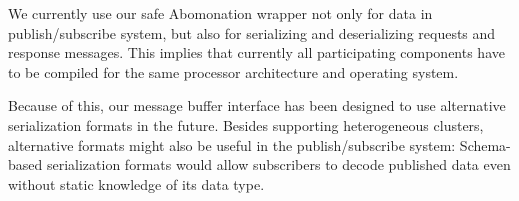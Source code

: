 We currently use our safe Abomonation wrapper not only for data in
publish/subscribe system, but also for serializing and deserializing requests
and response messages. This implies that currently all participating components
have to be compiled for the same processor architecture and operating system.

Because of this, our message buffer interface has been designed to use alternative
serialization formats in the future. Besides supporting heterogeneous clusters,
alternative formats might also be useful in the publish/subscribe system:
Schema-based serialization formats would allow subscribers to decode published
data even without static knowledge of its data type.
